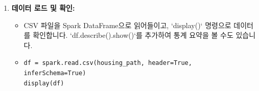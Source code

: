 \documentclass[11pt,a4paper]{article}
\begin{document}
\begin{enumerate}
\begin{itemize}
        \item \lstset{language=Python}
        \begin{lstlisting}[caption=데이터 경로 변수 설정 코드]
housing_path = "/Volumes/unity_catalog_demo/lab01/output/housing.csv"
        \end{lstlisting}
    \end{itemize}
    \item \textbf{데이터 로드 및 확인:}
    \begin{itemize}
        \item CSV 파일을 Spark DataFrame으로 읽어들이고, `display()` 명령으로 데이터를 확인합니다. `df.describe().show()`를 추가하여 통계 요약을 볼 수도 있습니다.
        \item \lstset{language=Python}
        \begin{lstlisting}[caption=데이터 로드 및 확인 코드]
df = spark.read.csv(housing_path, header=True, inferSchema=True)
display(df)
        \end{lstlisting}
    \end{itemize}
\end{enumerate}
\end{document}
